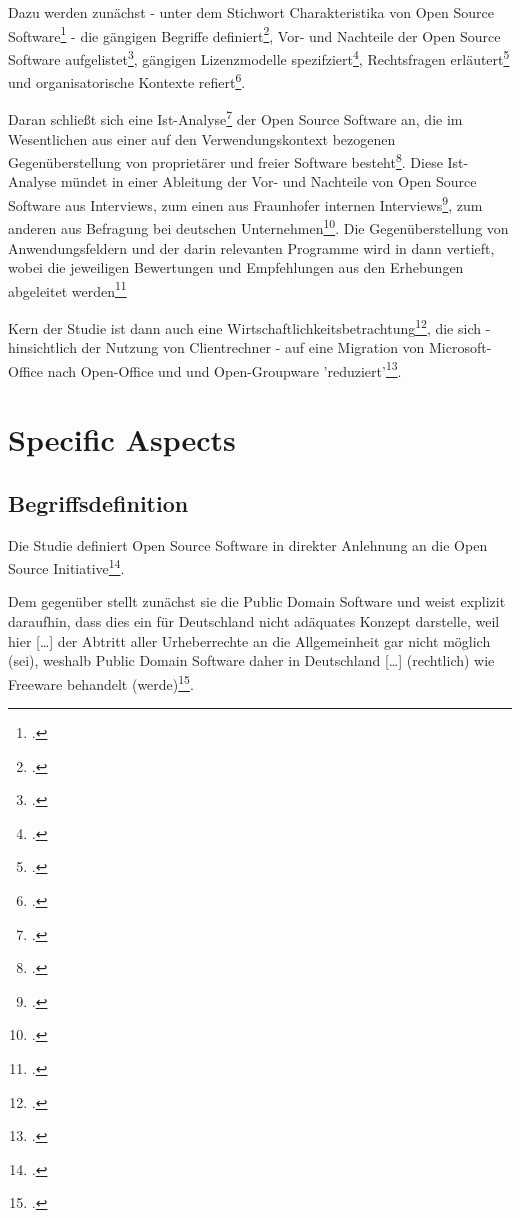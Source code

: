 \documentclass[DIV=calc,BCOR=5mm,11pt,headings=small,oneside,abstract=true, toc=bib]{scrartcl}
\begin{document}
Dazu werden zunächst - unter dem Stichwort \glqq{}Charakteristika von
Open Source Software\grqq{}\footcite[vgl.][12]{RenVetRexKet2005a} - die gängigen
Begriffe definiert\footcite[vgl.][12ff]{RenVetRexKet2005a}, Vor- und Nachteile
der Open Source Software aufgelistet\footcite[vgl.][16ff]{RenVetRexKet2005a},
gängigen Lizenzmodelle spezifziert\footcite[vgl.][19]{RenVetRexKet2005a},
Rechtsfragen erläutert\footcite[vgl.][23]{RenVetRexKet2005a} und
organisatorische Kontexte refiert\footcite[vgl.][29]{RenVetRexKet2005a}.

Daran schließt sich eine
\glqq{}Ist-Analyse\grqq{}\footcite[vgl.][31]{RenVetRexKet2005a} der Open Source
Software an, die im Wesentlichen aus einer auf den Verwendungskontext bezogenen
Gegenüberstellung von proprietärer und freier Software
besteht\footcite[vgl.][36]{RenVetRexKet2005a}. Diese Ist-Analyse mündet in einer
Ableitung der Vor- und Nachteile von Open Source Software aus Interviews, zum
einen aus Fraunhofer internen Interviews\footcite[vgl.][56f]{RenVetRexKet2005a},
zum anderen aus \glqq{}Befragung bei deutschen
Unternehmen\grqq{}\footcite[vgl.][68f]{RenVetRexKet2005a}. Die
Gegenüberstellung von \glqq{}Anwendungsfeldern\grqq{} und der darin relevanten
Programme wird in dann vertieft, wobei die jeweiligen \glqq{}Bewertungen
und Empfehlungen\grqq{} aus den \glqq{}Erhebungen\grqq{} abgeleitet
werden\footcite[vgl. dazu][70ff insbesondere S.82ff]{RenVetRexKet2005a}

Kern der Studie ist dann auch eine
\glqq{}Wirtschaftlichkeitsbetrachtung\grqq{}\footcite[vgl.][154]{RenVetRexKet2005a},
die sich - hinsichtlich der Nutzung von Clientrechner - auf eine Migration von
Microsoft-Office nach Open-Office und und Open-Groupware
'reduziert'\footcite[vgl.][156]{RenVetRexKet2005a}.

\section{Specific Aspects}

\subsection{Begriffsdefinition}

Die Studie definiert Open Source Software in direkter Anlehnung an die Open
Source Initiative\footcite[vgl.][12]{RenVetRexKet2005a}. 

Dem gegenüber stellt zunächst sie die Public Domain Software und weist explizit
daraufhin, dass dies ein für Deutschland nicht adäquates Konzept darstelle, weil
hier \glqq{}[\ldots] der Abtritt aller Urheberrechte an die Allgemeinheit gar
nicht möglich (sei)\grqq{}, weshalb Public Domain Software daher in Deutschland
\glqq{}[\ldots] (rechtlich) wie Freeware behandelt
(werde)\grqq{}\footcite[vgl.][14]{RenVetRexKet2005a}.
\end{document}
